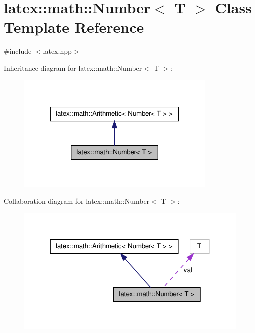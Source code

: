 \hypertarget{classlatex_1_1math_1_1Number}{\section{latex\-:\-:math\-:\-:\-Number$<$ \-T $>$ \-Class \-Template \-Reference}
\label{classlatex_1_1math_1_1Number}
}


{\ttfamily \#include $<$latex.\-hpp$>$}



\-Inheritance diagram for latex\-:\-:math\-:\-:\-Number$<$ \-T $>$\-:
\nopagebreak
\begin{figure}[H]
\begin{center}
\leavevmode
\includegraphics[width=272pt]{classlatex_1_1math_1_1Number__inherit__graph}
\end{center}
\end{figure}


\-Collaboration diagram for latex\-:\-:math\-:\-:\-Number$<$ \-T $>$\-:
\nopagebreak
\begin{figure}[H]
\begin{center}
\leavevmode
\includegraphics[width=318pt]{classlatex_1_1math_1_1Number__coll__graph}
\end{center}
\end{figure}
